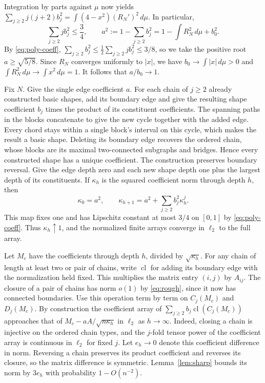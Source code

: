 \documentclass[preprints,article,submit,oneauthor]{Definitions/mdpi}
\newcommand{\abs}[1]{\lvert #1\rvert}
\begin{document}
Integration by parts against \(\mu\) now yields
\(\sum_{j\ge2}j(j+2)b_j^2=\int(4-x^2)(R_N')^2\,d\mu\). In particular,
\begin{equation}\label{eq:poly-coeff}
 \sum_{j\ge2}j b_j^2\le\frac34,
 \qquad a^2:=1-\sum_{j\ge2}b_j^2=1-\int R_N^2\,d\mu+b_0^2.
\end{equation}
By \eqref{eq:poly-coeff},
\(\sum_{j\ge2}b_j^2\le\tfrac12\sum_{j\ge2}j b_j^2\le3/8\), so we take
the positive root \(a\ge\sqrt{5/8}\). Since \(R_N\) converges uniformly
to \(\abs x\), we have \(b_0\to\int\abs x\,d\mu>0\) and
\(\int R_N^2\,d\mu\to\int x^2\,d\mu=1\). It follows that \(a/b_0\to1\).

Fix \(N\). Give the single edge coefficient \(a\). For each chain of
\(j\ge2\) already constructed basic shapes, add its boundary edge
and give the resulting shape coefficient \(b_j\) times the product
of its constituent coefficients. The spanning paths in the blocks
concatenate to give the new cycle together with the added edge.
Every chord stays within a single block's interval on this cycle,
which makes the result a basic shape. Deleting its boundary edge
recovers the ordered chain, whose blocks are its
maximal two-connected subgraphs and bridges. Hence every constructed
shape has a unique coefficient. The construction preserves boundary
reversal. Give the edge depth zero and each new shape depth one plus
the largest depth of its constituents. If \(\kappa_h\) is the squared
coefficient norm through depth \(h\), then
\[
 \kappa_0=a^2,\qquad \kappa_{h+1}=a^2+\sum_{j\ge2} b_j^2 \kappa_h^j.
\]
This map fixes one and has Lipschitz constant at most \(3/4\) on
\([0,1]\) by \eqref{eq:poly-coeff}. Thus \(\kappa_h\uparrow1\), and the
normalized finite arrays converge in \(\ell_2\) to the full array.

Let \(M_c\) have the coefficients through depth \(h\), divided by
\(\sqrt{\kappa_h}\). For any chain of length at least two or pair of
chains, write \(\operatorname{cl}\) for adding its boundary edge with
the normalization held fixed. This multiplies the matrix entry
\((i,j)\) by \(A_{ij}\). The closure of a pair of chains has norm
\(o(1)\) by \eqref{eq:rough}, since it now has connected boundaries.
Use this operation term by term on \(C_j(M_c)\) and \(D_j(M_c)\). By
construction the coefficient array of \(\sum_{j\ge2}b_j
\operatorname{cl}(C_j(M_c))\) approaches that of
\(M_c-a A/\sqrt{n\kappa_h}\) in \(\ell_2\) as \(h\to\infty\). Indeed,
closing a chain is injective on the ordered chain types, and the
\(j\)-fold tensor power of the coefficient array is continuous in
\(\ell_2\) for fixed \(j\). Let \(e_h\to0\) denote this coefficient
difference in norm. Reversing a chain preserves its product
coefficient and reverses its closure, so the matrix difference is
symmetric. Lemma~\ref{lem:sharp} bounds its norm by \(3e_h\) with
probability \(1-O(n^{-2})\).
\end{document}
